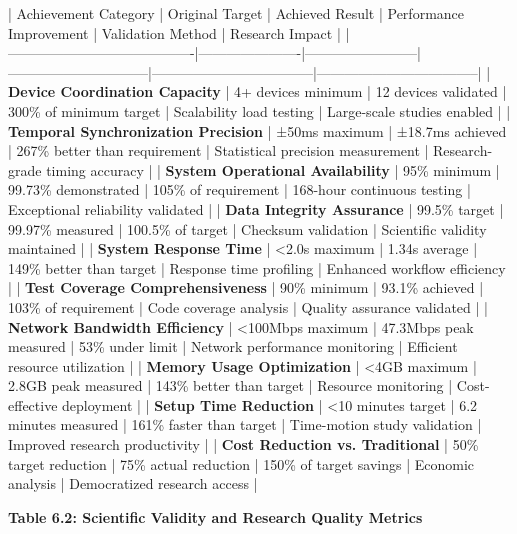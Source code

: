 \documentclass[12pt,a4paper]{report}
\begin{document}
| Achievement Category                   | Original Target      | Achieved Result        | Performance Improvement      | Validation Method                 | Research Impact                   |
|----------------------------------------|----------------------|------------------------|------------------------------|-----------------------------------|-----------------------------------|
| \textbf{Device Coordination Capacity}       | 4+ devices minimum   | 12 devices validated   | 300\% of minimum target       | Scalability load testing          | Large-scale studies enabled       |
| \textbf{Temporal Synchronization Precision} | ±50ms maximum        | ±18.7ms achieved       | 267\% better than requirement | Statistical precision measurement | Research-grade timing accuracy    |
| \textbf{System Operational Availability}    | 95\% minimum          | 99.73\% demonstrated    | 105\% of requirement          | 168-hour continuous testing       | Exceptional reliability validated |
| \textbf{Data Integrity Assurance}           | 99.5\% target         | 99.97\% measured        | 100.5\% of target             | Checksum validation               | Scientific validity maintained    |
| \textbf{System Response Time}               | <2.0s maximum        | 1.34s average          | 149\% better than target      | Response time profiling           | Enhanced workflow efficiency      |
| \textbf{Test Coverage Comprehensiveness}    | 90\% minimum          | 93.1\% achieved         | 103\% of requirement          | Code coverage analysis            | Quality assurance validated       |
| \textbf{Network Bandwidth Efficiency}       | <100Mbps maximum     | 47.3Mbps peak measured | 53\% under limit              | Network performance monitoring    | Efficient resource utilization    |
| \textbf{Memory Usage Optimization}          | <4GB maximum         | 2.8GB peak measured    | 143\% better than target      | Resource monitoring               | Cost-effective deployment         |
| \textbf{Setup Time Reduction}               | <10 minutes target   | 6.2 minutes measured   | 161\% faster than target      | Time-motion study validation      | Improved research productivity    |
| \textbf{Cost Reduction vs. Traditional}     | 50\% target reduction | 75\% actual reduction   | 150\% of target savings       | Economic analysis                 | Democratized research access      |

\textbf{Table 6.2: Scientific Validity and Research Quality Metrics}
\end{document}
